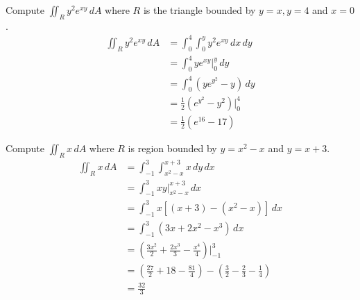 \documentclass[handout]{ximera}
\begin{document}
\begin{example}[Example 2]
\begin{image}
\end{image}



\end{example}


\begin{example}[Example 3]
Compute $\iint_R y^2 e^{xy} \, dA$ where $R$ is the triangle bounded by $y = x, y=4$ and $x=0$.\\
\begin{align*}
\iint_R y^2 e^{xy} \, dA & = \int_0^4 \int_0^{y} y^2 e^{xy} \, dx \, dy\\
                 & = \int_0^4 y e^{xy} \bigg|_{0}^{y} \, dy\\
                 & = \int_0^4  \left(ye^{y^2} - y \right)\, dy\\
                 &= \frac12 \left(e^{y^2} - y^2\right) \bigg|_0^4\\
                 &= \frac12 \left(e^{16} - 17\right)
\end{align*} 

\end{example}


\begin{example}[Example 4]
Compute $\iint_R x \, dA$ where $R$ is region bounded by $y = x^2 -x$ and $y = x+ 3$.\\

\begin{align*}
\iint_R x \, dA & = \int_{-1}^3 \int_{x^2 - x}^{x+3} x \, dy \, dx\\
                 & = \int_{-1}^3  xy \bigg|_{x^2 - x}^{x+3} \, dx\\
                 & = \int_{-1}^3  x\left[(x+3)-(x^2-x)\right]\, dx\\
                 &= \int_{-1}^3 \left(3x+ 2x^2  -x^3\right) \, dx\\
                 &= \left(\frac{3x^2}{2} + \frac{2x^3}{3} - \frac{x^4}{4}\right) \bigg|_{-1}^3\\
                 &= \left(\frac{27}{2} + 18 - \frac{81}{4} \right) - \left( \frac32 - \frac23 - \frac14 \right)\\
                 &= \frac{32}{3}
\end{align*}  

\end{example}
\end{document}
